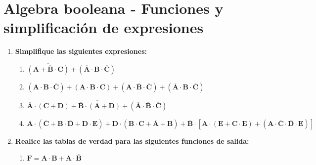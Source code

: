 \documentclass[12pt]{article}
\begin{document}
    
  
    \section*{\centering Algebra booleana - Funciones y simplificación de expresiones}

        \vspace{0.6cm}
        
        \begin{enumerate}[label = \textbf{\alph*.}]
            \item \textbf{Simplifique las siguientes expresiones:}
                \begin{enumerate}[label = \textbf{\arabic*.}]
                    \item $\mathbf{\overline{(A + \overline{B} \cdot C)} + (\overline{A} \cdot B \cdot \overline{C})}$
                    
                    \item $\mathbf{(A \cdot B \cdot \overline{C}) + (A \cdot B \cdot C) + (A \cdot \overline{B} \cdot \overline{C}) + (\overline{A}\cdot B \cdot \overline{C})}$
                    
                    \item $\mathbf{\overline{\overline{A} \cdot (C + D) + \overline{B} \cdot (A + D) + (\overline{A} \cdot \overline{B} \cdot \overline{C})}}$
                    
                    \item $\mathbf{A \cdot (\overline{C} + B \cdot \overline{D} + D \cdot E) + D \cdot (B \cdot C + \overline{A} + B) + \overline{B} \cdot [A \cdot (E + C \cdot E) + (A \cdot \overline{C} \cdot \overline{D} \cdot E)]}$
                    
                \end{enumerate}

            \item \textbf{Realice las tablas de verdad para las siguientes funciones de salida:}
                \begin{enumerate}[label = \textbf{\arabic*.}]
                    \item $\mathbf{F = A \cdot B + A \cdot \overline{B}}$
                    

\end{enumerate}
\end{enumerate}
\end{document}
